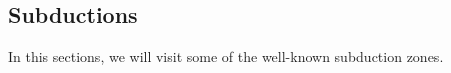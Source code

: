 \documentclass[extra,mreferee]{gji}
\begin{document}


\subsection{Subductions}

In this sections, we will visit some of the well-known subduction zones.
\end{document}

